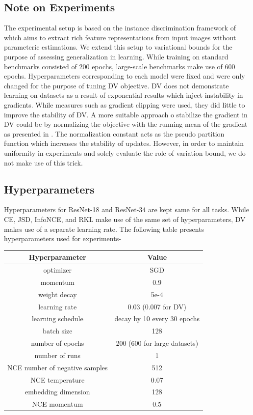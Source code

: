 \documentclass{article}
\begin{document}
\subsection{Note on Experiments}
The experimental setup is based on the instance discrimination framework of \cite{visual} which aims to extract rich feature representations from input images without parameteric estimations. We extend this setup to variational bounds for the purpose of assessing generalization in learning. While training on standard benchmarks consisted of 200 epochs, large-scale benchmarks make use of 600 epochs. Hyperparameters corresponding to each model were fixed and were only changed for the purpose of tuning DV objective. DV does not demonstrate learning on datasets as a result of exponential results which inject instability in gradients. While measures such as gradient clipping were used, they did little to improve the stability of DV. A more suitable approach o stabilize the gradient in DV could be by normalizing the objective with the running mean of the gradient as presented in \cite{infomax}. The normalization constant acts as the pseudo partition function which increases the stability of updates. However, in order to maintain uniformity in experiments and solely evaluate the role of variation bound, we do not make use of this trick. 

\subsection{Hyperparameters}
Hyperparameters for ResNet-18 and ResNet-34 are kept same for all tasks. While CE, JSD, InfoNCE, and RKL make use of the same set of hyperparameters, DV makes use of a separate learning rate. The following table presents hyperparameters used for experiments-

\begin{table}[H]
  \centering
  \begin{tabular}{c|c}
    Hyperparameter & Value \\ \hline
    optimizer & SGD\\
    momentum & 0.9\\
    weight decay & 5e-4\\
    learning rate & 0.03 (0.007 for DV)\\
    learning schedule & decay by 10 every 30 epochs\\
    batch size & 128\\
    number of epochs & 200 (600 for large datasets)\\
    number of runs & 1\\
    NCE number of negative samples & 512\\
    NCE temperature & 0.07\\
    embedding dimension & 128\\
    NCE momentum & 0.5
  \end{tabular}
\end{table}
\end{document}
